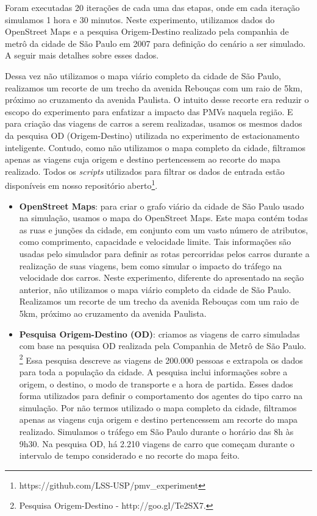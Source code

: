 Foram executadas 20 iterações de cada uma das etapas, onde em cada iteração simulamos 1 hora e 30 minutos.
Neste experimento, utilizamos dados do OpenStreet Maps e a pesquisa Origem-Destino realizado pela companhia de metrô da cidade de São Paulo em 2007 para definição do cenário a ser simulado.
A seguir mais detalhes sobre esses dados.

Dessa vez não utilizamos o mapa viário completo da cidade de São Paulo, realizamos um recorte de um trecho da avenida Rebouças com um raio de 5km, próximo ao cruzamento da avenida Paulista.
O intuito desse recorte era reduzir o escopo do experimento para enfatizar a impacto das PMVs naquela região.
E para criação das viagens de carros a serem realizadas, usamos os mesmos dados da pesquisa OD (Origem-Destino) utilizada no experimento de estacionamento inteligente.
Contudo, como não utilizamos o mapa completo da cidade, filtramos apenas as viagens cuja origem e destino pertencessem ao recorte do mapa realizado.
Todos os \textit{scripts} utilizados para filtrar os dados de entrada estão disponíveis em nosso repositório aberto\footnote{https://github.com/LSS-USP/pmv\_experiment}.

\begin{itemize}
    \item \textbf{OpenStreet Maps}: para criar o grafo viário da cidade de São Paulo usado na simulação, usamos o mapa do OpenStreet Maps.
        Este mapa contém todas as ruas e junções da cidade, em conjunto com um vasto número de atributos, como comprimento, capacidade e velocidade limite.
        Tais informações são usadas pelo simulador para definir as rotas percorridas pelos carros durante a realização de suas viagens, bem como simular o impacto do tráfego na velocidade dos carros.
        Neste experimento, diferente do apresentado na seção anterior, não utilizamos o mapa viário completo da cidade de São Paulo.
        Realizamos um recorte de um trecho da avenida Rebouças com um raio de 5km, próximo ao cruzamento da avenida Paulista.

    \item \textbf{Pesquisa Origem-Destino (OD)}: criamos as viagens de carro simuladas com base na pesquisa OD realizada pela Companhia de Metrô de São Paulo.
        \footnote{Pesquisa Origem-Destino - http://goo.gl/Te2SX7.}
        Essa pesquisa descreve as viagens de 200.000 pessoas e extrapola os dados para toda a população da cidade.
        A pesquisa inclui informações sobre a origem, o destino, o modo de transporte e a hora de partida.
        Esses dados forma utilizados para definir o comportamento dos agentes do tipo carro na simulação.
        Por não termos utilizado o mapa completo da cidade, filtramos apenas as viagens cuja origem e destino pertencessem am recorte do mapa realizado.
        Simulamos o tráfego em São Paulo durante o horário das 8h às 9h30.
        Na pesquisa OD, há 2.210 viagens de carro que começam durante o intervalo de tempo considerado e no recorte do mapa feito.
\end{itemize}

